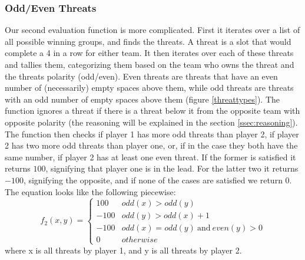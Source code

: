 \documentclass{article}
\begin{document}
\subsubsection{Odd/Even Threats}
\label{oddeven}
Our second evaluation function is more complicated. First it iterates over a list of all possible winning groups, and finds the threats. A threat is a slot that would complete a 4 in a row for either team. It then iterates over each of these threats and tallies them, categorizing them based on the team who owns the threat and the threats polarity (odd/even). Even threats are threats that have an even number of (necessarily) empty spaces above them, while odd threats are threats with an odd number of empty spaces above them (figure \ref{threattypes}). The function ignores a threat if there is a threat below it from the opposite team with opposite polarity (the reasoning will be explained in the section \ref{ssec:reasoning}).
The function then checks if player 1 has more odd threats than player 2, if player 2 has two more odd threats than player one, or, if in the case they both have the same number, if player 2 has at least one even threat. If the former is satisfied it returns $100$, signifying that player one is in the lead. For the latter two it returns $-100$, signifying the opposite, and if none of the cases are satisfied we return 0. The equation looks like the following piecewise:
\[ f_2(x,y)=\begin{cases} 
	100 & odd(x)>odd(y) \\
	-100 & odd(y)>odd(x)+1 \\
	-100 & odd(x)=odd(y)~\mbox{and}~even(y) > 0\\
	0 & otherwise
	\end{cases}
\]
where x is all threats by player 1, and y is all threats by player 2.
		
\end{document}

